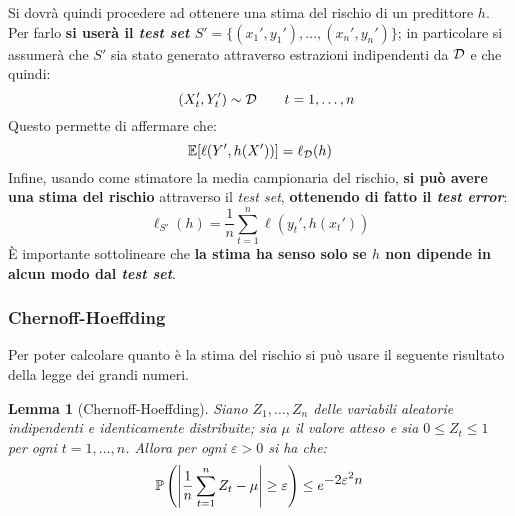 Si dovrà quindi procedere ad ottenere una stima del rischio di un predittore $h$.
Per farlo 
\textbf{si userà il \textit{test set} $S'=\{(x_1',y_1'),\dots,(x_n',y_n')\}$};
in particolare si assumerà che $S'$ sia stato generato attraverso estrazioni 
indipendenti da $\mathcal{D}$ e che quindi:
\begin{equation}
    \quad (X_t',Y_t') \sim \mathcal{D} \tag*{$t=1,\dots,n$}
\end{equation}
Questo permette di affermare che:
$$ \mathbb{E}[\ell(Y',h(X'))] = \ell_{\mathcal{D}}(h) $$
Infine, usando come stimatore la media campionaria del rischio, \textbf{si può
avere una stima del rischio} attraverso il \textit{test set}, \textbf{ottenendo
di fatto il \textit{test error}}:
$$ \ell_{S'}(h) = \frac{1}{n}\sum_{t=1}^n \ell(y_t',h(x_t')) $$
È importante sottolineare che \textbf{la stima ha senso solo se $h$ non dipende
in alcun modo dal \textit{test set}}.

\subsubsection{Chernoff-Hoeffding}
Per poter calcolare quanto  è la stima del rischio si può usare
il seguente risultato della legge dei grandi numeri.

\newtheorem{lemma}{Lemma}

\begin{lemma}[Chernoff-Hoeffding]
    Siano $Z_1,\dots,Z_n$ delle variabili aleatorie indipendenti e
    identicamente distribuite; sia $\mu$ il valore atteso e sia $0\leq Z_t\leq1$
    per ogni $t=1,\dots,n$. Allora per ogni $\varepsilon>0$ si ha che:
    $$ \mathbb{P} \left(
        \left| \frac{1}{n}\sum_{t=1}^n Z_t-\mu \right| \geq \varepsilon
    \right) \leq e^{\displaystyle-2\varepsilon^2n} $$
\end{lemma}